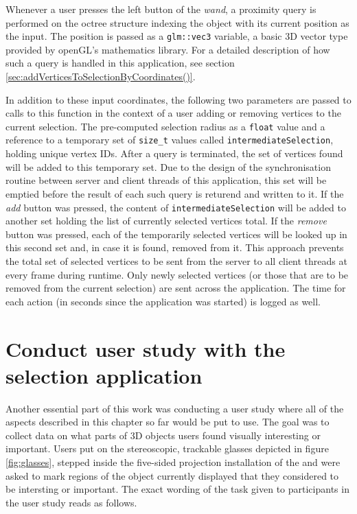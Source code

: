 Whenever a user presses the left button of the \textit{wand}, a proximity query is performed on the octree structure indexing the object with its current position as the input. The position is passed as a \texttt{glm::vec3} variable, a basic 3D vector type provided by openGL's mathematics library. For a detailed description of how such a query is handled in this application, see section \ref{sec:addVerticesToSelectionByCoordinates()}.

In addition to these input coordinates, the following two parameters are passed to calls to this function in the context of a user adding or removing vertices to the current selection. The pre-computed selection radius as a \texttt{float} value and a reference to a temporary set of \texttt{size\_t} values called \texttt{intermediateSelection}, holding unique vertex IDs. After a query is terminated, the set of vertices found will be added to this temporary set.
Due to the design of the synchronisation routine between server and client threads of this application, this set will be emptied before the result of each such query is returend and written to it. If the \textit{add} button was pressed, the content of \texttt{intermediateSelection} will be added to another set holding the list of currently selected vertices total. If the \textit{remove} button was pressed, each of the temporarily selected vertices will be looked up in this second set and, in case it is found, removed from it. This approach prevents the total set of selected vertices to be sent from the server to all client threads at every frame during runtime. Only newly selected vertices (or those that are to be removed from the current selection) are sent across the application. The time for each action (in seconds since the application was started) is logged as well. 

	\section {Conduct user study with the selection application}
	\label{sec:conduct_user_study_with_the_selection_application}
Another essential part of this work was conducting a user study where all of the aspects described in this chapter so far would be put to use. The goal was to collect data on what parts of 3D objects users found visually interesting or important. Users put on the stereoscopic, trackable glasses depicted in figure \ref{fig:glasses}, stepped inside the five-sided projection installation of the \cite{v2c} and were asked to mark regions of the object currently displayed that they considered to be intersting or important. The exact wording of the task given to participants in the user study reads as follows.

